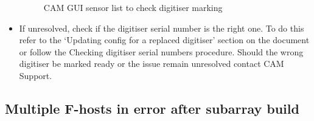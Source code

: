 \begin{itemize}
\begin{figure}[!thb]
	\caption{CAM GUI sensor list to check digitiser marking}
	\label{fig:image9}
\end{figure}
\item{} If unresolved, check if the digitiser serial number is the right one. To do this refer to the ‘Updating config for a replaced digitiser’ section on the document or follow the Checking digitiser serial numbers procedure. Should the wrong digitiser be marked ready or the issue remain unresolved contact CAM Support.
\end{itemize}

\subsection{ Multiple F-hosts in error after subarray build}

